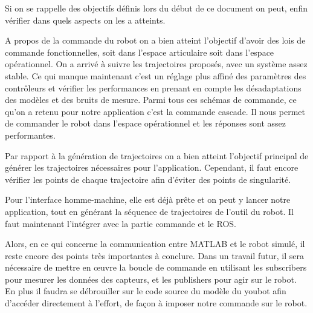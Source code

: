 Si on se rappelle des objectifs définis lors du début de ce document on peut, enfin vérifier dans quels aspects on les a atteints.

A propos de la commande du robot on a bien atteint l’objectif d’avoir des lois de commande fonctionnelles, soit dans l’espace articulaire soit dans l’espace opérationnel. On a arrivé à suivre les trajectoires proposés, avec un système assez stable. Ce qui manque maintenant c’est un réglage plus affiné des paramètres des contrôleurs et vérifier les performances en prenant en compte les désadaptations des modèles et des bruits de mesure. Parmi tous ces schémas de commande, ce qu’on a retenu pour notre application c’est la commande cascade. Il nous permet de commander le robot dans l’espace opérationnel et les réponses sont assez performantes.

Par rapport à la génération de trajectoires on a bien atteint l’objectif principal de générer les trajectoires nécessaires pour l’application. Cependant, il faut encore vérifier les points de chaque trajectoire afin d’éviter des points de singularité.

Pour l’interface homme-machine, elle est déjà prête et on peut y lancer notre application, tout en générant la séquence de trajectoires de l’outil du robot. Il faut maintenant l’intégrer avec la partie commande et le ROS.

Alors, en ce qui concerne la communication entre MATLAB et le robot simulé, il reste encore des points très importantes à conclure. Dans un travail futur, il sera nécessaire de mettre en \oe{}uvre la boucle de commande en utilisant les subscribers pour mesurer les données des capteurs, et les publishers pour agir sur le robot. En plus il faudra se débrouiller sur le code source du modèle du youbot afin d’accéder directement à l’effort, de façon à imposer notre commande sur le robot.
